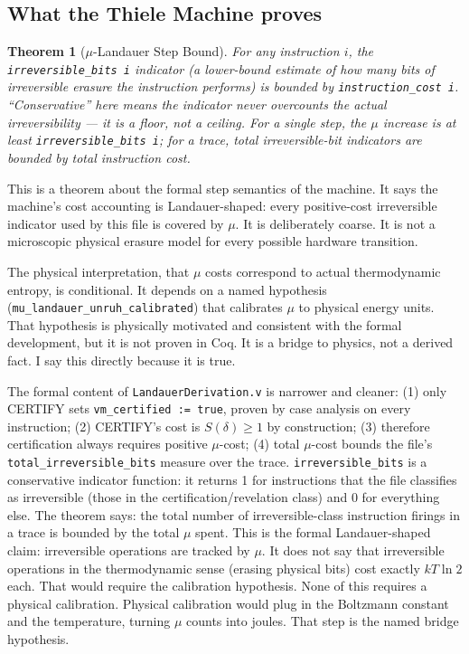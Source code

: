 \documentclass[11pt,a4paper]{article}
\theoremstyle{plain}
\newtheorem{theorem}{Theorem}[section]
\theoremstyle{definition}
\theoremstyle{remark}
\begin{document}
\subsection{What the Thiele Machine proves}

\begin{theorem}[$\mu$-Landauer Step Bound]
For any instruction $i$, the \texttt{irreversible\_bits i} indicator (a lower-bound estimate of how many bits of irreversible erasure the instruction performs) is bounded by \texttt{instruction\_cost i}. ``Conservative'' here means the indicator never overcounts the actual irreversibility --- it is a floor, not a ceiling. For a single step, the $\mu$ increase is at least \texttt{irreversible\_bits i}; for a trace, total irreversible-bit indicators are bounded by total instruction cost.
\end{theorem}

This is a theorem about the formal step semantics of the machine. It says the machine's cost accounting is Landauer-shaped: every positive-cost irreversible indicator used by this file is covered by $\mu$. It is deliberately coarse. It is not a microscopic physical erasure model for every possible hardware transition.

The physical interpretation, that $\mu$ costs correspond to actual thermodynamic entropy, is conditional. It depends on a named hypothesis (\texttt{mu\_landauer\_unruh\_calibrated}) that calibrates $\mu$ to physical energy units. That hypothesis is physically motivated and consistent with the formal development, but it is not proven in Coq. It is a bridge to physics, not a derived fact. I say this directly because it is true.

The formal content of \texttt{LandauerDerivation.v} is narrower and cleaner: (1) only CERTIFY sets \texttt{vm\_certified := true}, proven by case analysis on every instruction; (2) CERTIFY's cost is $S(\delta) \geq 1$ by construction; (3) therefore certification always requires positive $\mu$-cost; (4) total $\mu$-cost bounds the file's \texttt{total\_irreversible\_bits} measure over the trace. \texttt{irreversible\_bits} is a conservative indicator function: it returns 1 for instructions that the file classifies as irreversible (those in the certification/revelation class) and 0 for everything else. The theorem says: the total number of irreversible-class instruction firings in a trace is bounded by the total $\mu$ spent. This is the formal Landauer-shaped claim: irreversible operations are tracked by $\mu$. It does not say that irreversible operations in the thermodynamic sense (erasing physical bits) cost exactly $kT\ln 2$ each. That would require the calibration hypothesis. None of this requires a physical calibration. Physical calibration would plug in the Boltzmann constant and the temperature, turning $\mu$ counts into joules. That step is the named bridge hypothesis.
\end{document}
